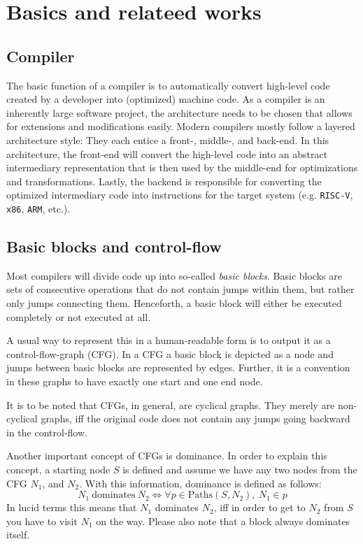 \chapter{Basics and relateed works}\label{sec:basics}

\section{Compiler}\label{sec:basics:compiler}

The basic function of a compiler is to automatically convert high-level code created by a developer into (optimized) machine code.
As a compiler is an inherently large software project, the architecture needs to be chosen that allows for extensions and modifications easily.
Modern compilers mostly follow a layered architecture style: They each entice a front-, middle-, and back-end.
In this architecture, the front-end will convert the high-level code into an abstract intermediary representation that is then used by the middle-end for optimizations and transformations.
Lastly, the backend is responsible for converting the optimized intermediary code into instructions for the target system (e.g. \texttt{RISC-V}, \texttt{x86}, \texttt{ARM}, etc.).

\section{Basic blocks and control-flow}\label{sec:basics:bb-cf}

Most compilers will divide code up into so-called \textit{basic blocks}.
Basic blocks are sets of consecutive operations that do not contain jumps within them, but rather only jumps connecting them.
Henceforth, a basic block will either be executed completely or not executed at all.

A usual way to represent this in a human-readable form is to output it as a control-flow-graph (CFG).
In a CFG a basic block is depicted as a node and jumps between basic blocks are represented by edges.
Further, it is a convention in these graphs to have exactly one start and one end node.

It is to be noted that CFGs, in general, are cyclical graphs.
They merely are non-cyclical graphs, iff the original code does not contain any jumps going backward in the control-flow.

Another important concept of CFGs is dominance.
In order to explain this concept, a starting node $S$ is defined and assume we have any two nodes from the CFG $N_1$, and $N_2$.
With this information, dominance is defined as follows:
$$N_1~\text{dominates}~N_2 \Longleftrightarrow \forall p \in \text{Paths}(S, N_2),~N_1 \in p$$
In lucid terms this means that $N_1$ dominates $N_2$, iff in order to get to $N_2$ from $S$ you have to visit $N_1$ on the way.
Please also note that a block always dominates itself.


